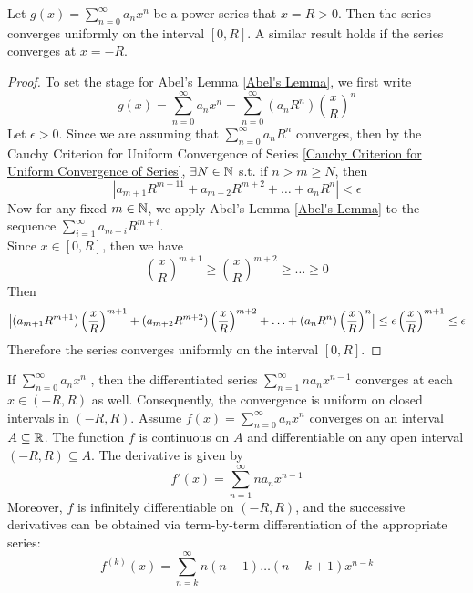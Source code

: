 \documentclass[11pt]{article}
\begin{document}
 Let $g(x) = \sum_{n=0}^\infty a_nx^n$ be a power series that  $x = R > 0$. Then the series converges uniformly on the interval $[0, R]$. A similar result holds if the series converges at $x = -R$.
\begin{proof}
	To set the stage for Abel's Lemma \ref{Abel's Lemma}, we first write
	$$g(x) = \sum_{n=0}^\infty a_n x^n = \sum_{n=0}^\infty (a_nR^n)\left( \frac{x}{R}\right)^n$$
	Let $\epsilon > 0$. Since we are assuming that $\sum_{n=0}^\infty a_nR^n$ converges, then by the Cauchy Criterion for Uniform Convergence of Series \ref{Cauchy Criterion for Uniform Convergence of Series}, $\exists N \in \mathbb{N}$ s.t. if $n > m \geq N$, then
	$$|a_{m+1}R^{m+11} + a_{m+2}R^{m+2} + \hdots + a_nR^n| < \epsilon$$
	Now for any fixed $m \in \mathbb{N}$, we apply Abel's Lemma \ref{Abel's Lemma} to the sequence $\sum_{i=1}^\infty a_{m+i} R^{m+i}$.\\
	Since $x \in [0, R]$, then we have
	$$\left(\frac{x}{R}\right)^{m+1} \geq \left(\frac{x}{R}\right)^{m+2} \geq \hdots \geq 0$$
	Then $$\big \vert {(a_{m+1}R^{m+1})\left(\frac{x}{R}\right)^{m+1} + (a_{m+2}R^{m+2})\left(\frac{x}{R}\right)^{m+2} + \hdots +(a_{n}R^{n})\left(\frac{x}{R}\right)^{n}  } \big \vert \leq \epsilon\left(\frac{x}{R}\right)^{m+1} \leq \epsilon$$
	Therefore the series converges uniformly on the interval $[0, R]$.
\end{proof}

\theorem If $\sum_{n=0}^\infty a_nx^n$ , then the differentiated series $\sum_{n=1}^\infty na_nx^{n-1}$ converges at each $x \in (-R, R)$ as well. Consequently, the convergence is uniform on closed intervals in $(-R, R)$.
\theorem
Assume $f(x) = \sum_{n=0}^\infty a_nx^n$ converges on an interval $A \subseteq \mathbb{R}$. The function $f$ is continuous on $A$ and differentiable on any open interval $(-R, R) \subseteq A$. The derivative is given by
$$f'(x) = \sum_{n=1}^\infty n a_n x^{n-1}$$
Moreover, $f$ is infinitely differentiable on $(-R, R)$, and the successive derivatives can be obtained via term-by-term differentiation of the appropriate series:
$$f^{(k)}(x) = \sum_{n=k}^\infty n(n-1)\hdots (n-k+1) x^{n-k}$$
\end{document}
